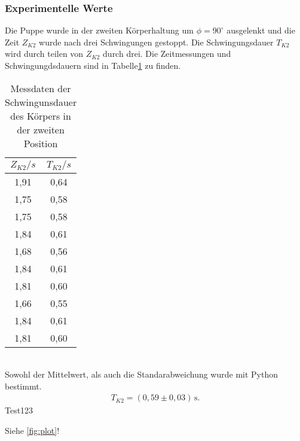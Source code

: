\subsubsection{Experimentelle Werte}
Die Puppe wurde in der zweiten Körperhaltung um $\phi = 90^{\circ}$ ausgelenkt und die Zeit $Z_{K2}$
wurde nach drei Schwingungen gestoppt. Die Schwingungsdauer $T_{K2}$ wird durch teilen von $Z_{K2}$
durch drei. Die Zeitmessungen und Schwingungdsdauern sind in Tabelle\ref{tab:Koerper2} zu finden.
\begin{table}
  \centering
  \caption{Messdaten der Schwingunsdauer des Körpers in der zweiten Position}
  \label{tab:Koerper2}
  \begin{tabular}{c c}
    \toprule
    $Z_{K2}/s$ & $T_{K2}/s$ \\
    \midrule
    1,91 & 0,64 \\
    1,75 & 0,58 \\
    1,75 & 0,58 \\
    1,84 & 0,61 \\
    1,68 & 0,56 \\
    1,84 & 0,61 \\
    1,81 & 0,60 \\
    1,66 & 0,55 \\
    1,84 & 0,61 \\
    1,81 & 0,60 \\
    \bottomrule
  \end{tabular}
\end{table}
\\
Sowohl der Mittelwert, als auch die Standarabweichung wurde mit Python bestimmt.
\begin{align*}
  T_{K2} = (0{,}59 \pm 0{,}03)\, \mathrm{s} .
\end{align*}
Test123

Siehe \autoref{fig:plot}!
